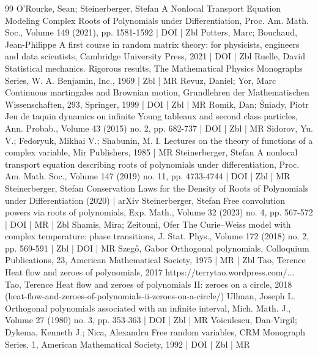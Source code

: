 \begin{thebibliography}{99}
O’Rourke, Sean; Steinerberger, Stefan A Nonlocal Transport Equation Modeling Complex Roots of Polynomials under Differentiation, Proc. Am. Math. Soc., Volume 149 (2021), pp. 1581-1592 | DOI | Zbl
Potters, Marc; Bouchaud, Jean-Philippe A first course in random matrix theory: for physicists, engineers and data scientists, Cambridge University Press, 2021 | DOI | Zbl
Ruelle, David Statistical mechanics. Rigorous results, The Mathematical Physics Monographs Series, W. A. Benjamin, Inc., 1969 | Zbl | MR
Revuz, Daniel; Yor, Marc Continuous martingales and Brownian motion, Grundlehren der Mathematischen Wissenschaften, 293, Springer, 1999 | DOI | Zbl | MR
Romik, Dan; Śniady, Piotr Jeu de taquin dynamics on infinite Young tableaux and second class particles, Ann. Probab., Volume 43 (2015) no. 2, pp. 682-737 | DOI | Zbl | MR
Sidorov, Yu. V.; Fedoryuk, Mikhai V.; Shabunin, M. I. Lectures on the theory of functions of a complex variable, Mir Publishers, 1985 | MR
Steinerberger, Stefan A nonlocal transport equation describing roots of polynomials under differentiation, Proc. Am. Math. Soc., Volume 147 (2019) no. 11, pp. 4733-4744 | DOI | Zbl | MR
Steinerberger, Stefan Conservation Laws for the Density of Roots of Polynomials under Differentiation (2020) | arXiv
Steinerberger, Stefan Free convolution powers via roots of polynomials, Exp. Math., Volume 32 (2023) no. 4, pp. 567-572 | DOI | MR | Zbl
Shamis, Mira; Zeitouni, Ofer The Curie–Weiss model with complex temperature: phase transitions, J. Stat. Phys., Volume 172 (2018) no. 2, pp. 569-591 | Zbl | DOI | MR
Szegő, Gabor Orthogonal polynomials, Colloquium Publications, 23, American Mathematical Society, 1975 | MR | Zbl
Tao, Terence Heat flow and zeroes of polynomials, 2017 https://terrytao.wordpress.com/...
Tao, Terence Heat flow and zeroes of polynomials II: zeroes on a circle, 2018 (heat-flow-and-zeroes-of-polynomials-ii-zeroes-on-a-circle/)
Ullman, Joseph L. Orthogonal polynomials associated with an infinite interval, Mich. Math. J., Volume 27 (1980) no. 3, pp. 353-363 | DOI | Zbl | MR
Voiculescu, Dan-Virgil; Dykema, Kenneth J.; Nica, Alexandru Free random variables, CRM Monograph Series, 1, American Mathematical Society, 1992 | DOI | Zbl | MR

\end{thebibliography}
